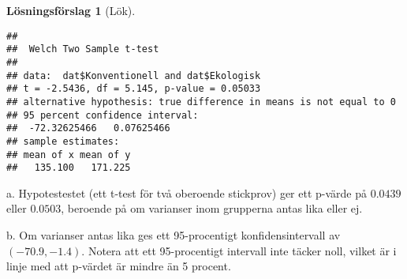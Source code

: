 \documentclass[
]{book}
\theoremstyle{definition}
\theoremstyle{definition}
\theoremstyle{definition}
\theoremstyle{definition}
\newtheorem{hypothesis}{Lösningsförslag}[chapter]
\theoremstyle{remark}
\begin{document}
\begin{hypothesis}[Lök]
\begin{verbatim}
## 
##  Welch Two Sample t-test
## 
## data:  dat$Konventionell and dat$Ekologisk
## t = -2.5436, df = 5.145, p-value = 0.05033
## alternative hypothesis: true difference in means is not equal to 0
## 95 percent confidence interval:
##  -72.32625466   0.07625466
## sample estimates:
## mean of x mean of y 
##   135.100   171.225
\end{verbatim}

a. Hypotestestet (ett t-test för två oberoende stickprov) ger ett p-värde på \(0.0439\) eller \(0.0503\), beroende på om varianser inom grupperna antas lika eller ej.

b. Om varianser antas lika ges ett 95-procentigt konfidensintervall av \((-70.9, -1.4)\). Notera att ett 95-procentigt intervall inte täcker noll, vilket är i linje med att p-värdet är mindre än 5 procent.
\end{hypothesis}
\end{document}
